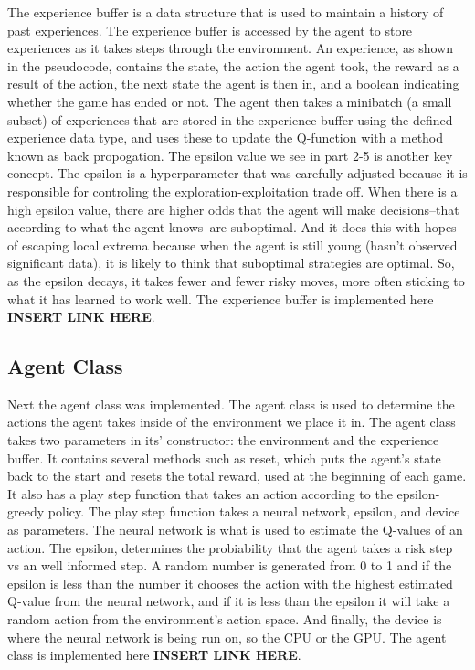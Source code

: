 \documentclass[12pt, a4paper, twocolumn]{article} %
\begin{document}
The experience buffer is a data structure that is used to maintain a history of past experiences. The experience buffer is accessed by the agent to store experiences as it takes steps through the environment. An experience, as shown in the pseudocode, contains the state, the action the agent took, the reward as a result of the action, the next state the agent is then in, and a boolean indicating whether the game has ended or not. The agent then takes a minibatch (a small subset) of experiences that are stored in the experience buffer using the defined experience data type, and uses these to update the Q-function with a method known as back propogation. The epsilon value we see in part 2-5 is another key concept. The epsilon is a hyperparameter that was carefully adjusted because it is responsible for controling the exploration-exploitation trade off. When there is a high epsilon value, there are higher odds that the agent will make decisions--that according to what the agent knows--are suboptimal. And it does this with hopes of escaping local extrema because when the agent is still young (hasn't observed significant data), it is likely to think that suboptimal strategies are optimal. So, as the epsilon decays, it takes fewer and fewer risky moves, more often sticking to what it has learned to work well. The experience buffer is implemented here \textbf{INSERT LINK HERE}. 

\subsection{Agent Class}

Next the agent class was implemented. The agent class is used to determine the actions the agent takes inside of the environment we place it in. The agent class takes two parameters in its' constructor: the environment and the experience buffer. It contains several methods such as reset, which puts the agent's state back to the start and resets the total reward, used at the beginning of each game. It also has a play step function that takes an action according to the epsilon-greedy policy. The play step function takes a neural network, epsilon, and device as parameters. The neural network is what is used to estimate the Q-values of an action. The epsilon, determines the probiability that the agent takes a risk step vs an well informed step. A random number is generated from 0 to 1 and if the epsilon is less than the number it chooses the action with the highest estimated Q-value from the neural network, and if it is less than the epsilon it will take a random action from the environment's action space. And finally, the device is where the neural network is being run on, so the CPU or the GPU. The agent class is implemented here \textbf{INSERT LINK HERE}. 
\end{document}
